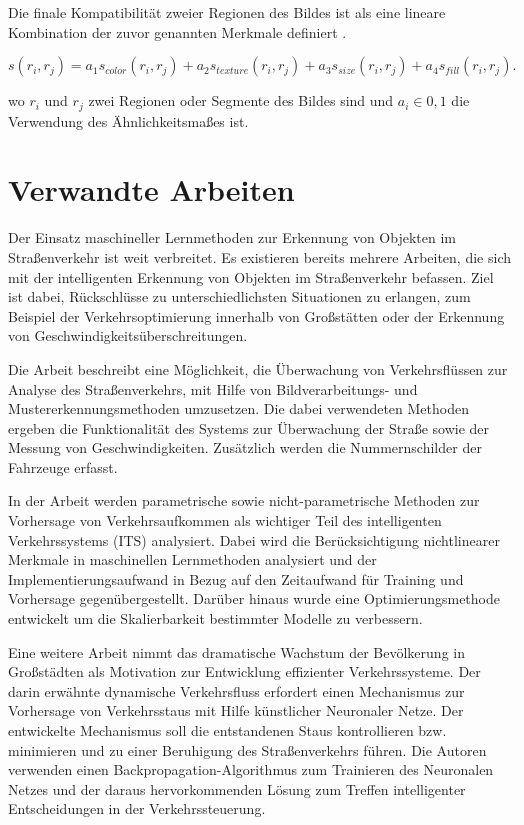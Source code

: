 Die finale Kompatibilität zweier Regionen des Bildes ist als eine lineare Kombination der zuvor genannten Merkmale definiert \cite{learnopencv}.

\begin{equation}
	s(r_{i},r_{j}) = a_1 s_{color}(r_i,r_j) + a_2 s_{texture}(r_i,r_j) + a_3 s_{size}(r_i,r_j) + a_4 s_{fill}(r_i,r_j).
\end{equation}

wo $r_i$ und $r_j$ zwei Regionen oder Segmente des Bildes sind und $a_i \in 0,1$ die Verwendung des Ähnlichkeitsmaßes ist.

\section{Verwandte Arbeiten}
Der Einsatz maschineller Lernmethoden zur Erkennung von Objekten im Straßenverkehr ist weit verbreitet.
Es existieren bereits mehrere Arbeiten, die sich mit der intelligenten Erkennung von Objekten im Straßenverkehr befassen. Ziel ist dabei, Rückschlüsse zu unterschiedlichsten Situationen zu erlangen, zum Beispiel der Verkehrsoptimierung innerhalb von Großstätten oder der Erkennung von Geschwindigkeitsüberschreitungen.

Die Arbeit \cite{Atkočiūnas_Blake_Juozapavičius_Kazimianec_2005} beschreibt eine Möglichkeit, die Überwachung von Verkehrsflüssen zur Analyse des Straßenverkehrs, mit Hilfe von Bildverarbeitungs- und Mustererkennungsmethoden umzusetzen. Die dabei verwendeten Methoden ergeben die Funktionalität des Systems zur Überwachung der Straße sowie der Messung von Geschwindigkeiten. Zusätzlich werden die Nummernschilder der Fahrzeuge erfasst.


In der Arbeit \cite{9148964} werden parametrische sowie nicht-parametrische Methoden zur Vorhersage von Verkehrsaufkommen als wichtiger Teil des intelligenten Verkehrssystems (ITS) analysiert. Dabei wird die Berücksichtigung nichtlinearer Merkmale in maschinellen Lernmethoden analysiert und der Implementierungsaufwand in Bezug auf den Zeitaufwand für Training und Vorhersage gegenübergestellt. Darüber hinaus wurde eine Optimierungsmethode entwickelt um die Skalierbarkeit bestimmter Modelle zu verbessern.

Eine weitere Arbeit \cite{ata2019modelling} nimmt das dramatische Wachstum der Bevölkerung in Großstädten als Motivation zur Entwicklung effizienter Verkehrssysteme. Der darin erwähnte dynamische Verkehrsfluss erfordert einen Mechanismus zur Vorhersage von Verkehrsstaus mit Hilfe künstlicher Neuronaler Netze. Der entwickelte Mechanismus soll die entstandenen Staus kontrollieren bzw. minimieren und zu einer Beruhigung des Straßenverkehrs führen. Die Autoren verwenden einen Backpropagation-Algorithmus zum Trainieren des Neuronalen Netzes und der daraus hervorkommenden Lösung zum Treffen intelligenter Entscheidungen in der Verkehrssteuerung.

